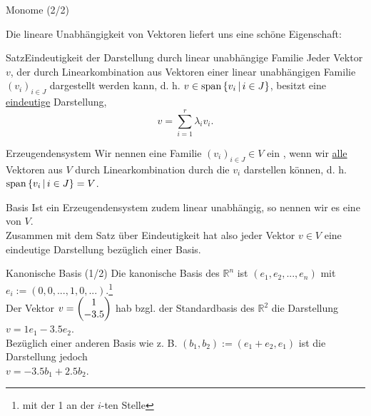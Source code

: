 \begin{Beispiel}
{Monome (2/2)}
\end{Beispiel}
Die lineare Unabhängigkeit von Vektoren liefert uns eine schöne Eigenschaft:
\begin{Satz}
{Satz}{Eindeutigkeit der Darstellung durch linear unabhängige Familie}
Jeder Vektor $v$, der durch Linearkombination aus Vektoren einer linear unabhängigen Familie $(v_i)_{i\in J}$ dargestellt werden kann, d. h. $v\in\text{span}\left\{v_i\,|\, i\in J\right\}$, besitzt eine \underline{eindeutige} Darstellung,
\begin{equation*}
    v=\sum_{i=1}^r\lambda_iv_i.
\end{equation*}
\end{Satz}
\begin{Def}
{Erzeugendensystem}
Wir nennen eine Familie $(v_i)_{i\in J}\in V$ ein , wenn wir \underline{alle} Vektoren aus $V$ durch Linearkombination durch die $v_i$ darstellen können, d. h. $\text{span}\left\{v_i\,|\, i\in J\right\}=V$.
\end{Def}
\begin{Def}
{Basis}
Ist ein Erzeugendensystem zudem linear unabhängig, so nennen wir es eine  von $V$.\\
Zusammen mit dem Satz über Eindeutigkeit hat also jeder Vektor $v\in V$ eine eindeutige Darstellung bezüglich einer Basis.
\end{Def}
\begin{Beispiel}
{Kanonische Basis (1/2)}
Die kanonische Basis des $\mathbb{R}^n$ ist $(e_1,e_2,...,e_n)$ mit $e_i:=(0,0,...,1,0,...)$.\footnote{mit der 1 an der $i$-ten Stelle}\\
Der Vektor $v=\begin{pmatrix}1\\-3.5\end{pmatrix}$ hab bzgl. der Standardbasis des $\mathbb{R}^2$ die Darstellung\\$v=1e_1-3.5e_2$.\\
Bezüglich einer anderen Basis wie z. B. $(b_1,b_2):=(e_1+e_2,e_1)$ ist die Darstellung jedoch\\
$v=-3.5b_1+2.5b_2$.
\end{Beispiel}
